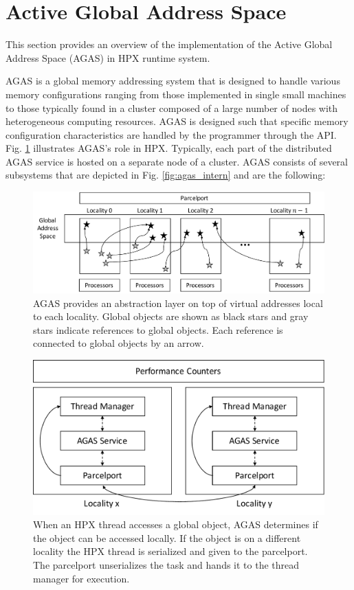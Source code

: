 \section{Active Global Address Space}
\label{agas}

This section provides an overview of the implementation of the Active Global
Address Space (AGAS) in HPX runtime system.

AGAS is a global memory addressing system that is designed to
handle various memory configurations ranging from those implemented in single small
machines to those typically found in a cluster composed of a large number of
nodes with heterogeneous computing resources. AGAS is designed such that
specific memory configuration characteristics are handled by the programmer
through the API. Fig.
\ref{fig:agas_struct} illustrates AGAS's role in HPX. Typically, 
each part of the distributed AGAS service is hosted on a separate node of a
cluster. AGAS consists of several subsystems that are depicted in Fig.
\ref{fig:agas_intern} and are the following:

\begin{figure}[t]
    \centering
    \includegraphics[width=.49\textwidth,height=\textheight,keepaspectratio]{illustrations/agas_struct}
    \caption{AGAS provides an abstraction layer on top of virtual addresses local to each locality. Global objects are shown as black stars and gray stars indicate references to global objects. Each reference is connected to global objects by an arrow.}
    \label{fig:agas_struct}
\end{figure}
\begin{figure}[t]
    \centering
    \includegraphics[width=.49\textwidth,height=\textheight,keepaspectratio]{illustrations/agas_interaction}
    \caption{When an HPX thread accesses a global object, AGAS determines if the object can be accessed locally. If the object is on a different locality the HPX thread is serialized and given to the parcelport. The parcelport unserializes the task and hands it to the thread manager for execution.}
    \label{fig:agas_interaction}
\end{figure}

